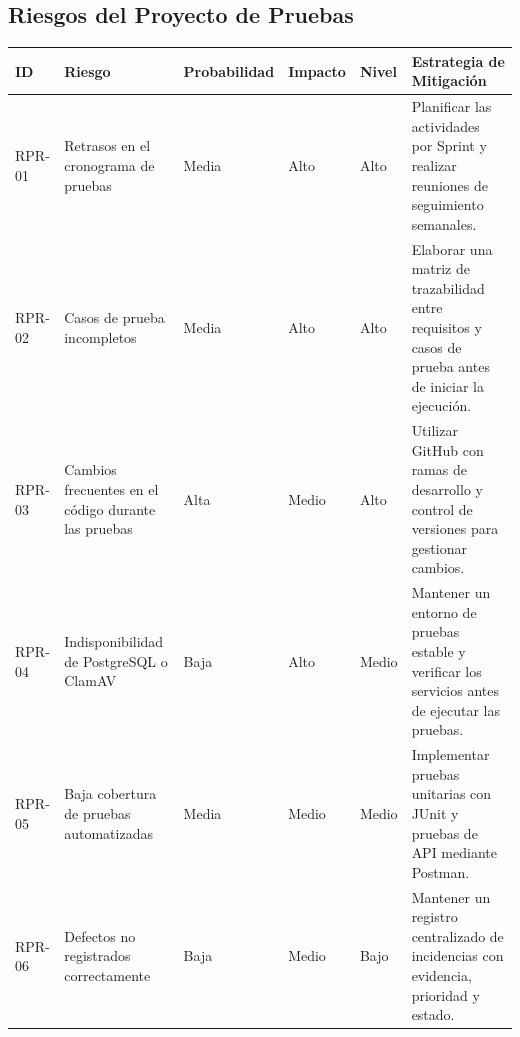 \subsection*{Riesgos del Proyecto de Pruebas}
\begin{longtable}{|p{1.5cm}|p{5cm}|p{2.5cm}|p{2.5cm}|p{2cm}|p{4cm}|}
\hline
\textbf{ID} & \textbf{Riesgo} & \textbf{Probabilidad} & \textbf{Impacto} & \textbf{Nivel} & \textbf{Estrategia de Mitigación} \\
\hline
RPR-01 & Retrasos en el cronograma de pruebas & Media & Alto & Alto & Planificar las actividades por Sprint y realizar reuniones de seguimiento semanales. \\
\hline
RPR-02 & Casos de prueba incompletos & Media & Alto & Alto & Elaborar una matriz de trazabilidad entre requisitos y casos de prueba antes de iniciar la ejecución. \\
\hline
RPR-03 & Cambios frecuentes en el código durante las pruebas & Alta & Medio & Alto & Utilizar GitHub con ramas de desarrollo y control de versiones para gestionar cambios. \\
\hline
RPR-04 & Indisponibilidad de PostgreSQL o ClamAV & Baja & Alto & Medio & Mantener un entorno de pruebas estable y verificar los servicios antes de ejecutar las pruebas. \\
\hline
RPR-05 & Baja cobertura de pruebas automatizadas & Media & Medio & Medio & Implementar pruebas unitarias con JUnit y pruebas de API mediante Postman. \\
\hline
RPR-06 & Defectos no registrados correctamente & Baja & Medio & Bajo & Mantener un registro centralizado de incidencias con evidencia, prioridad y estado. \\
\hline
\end{longtable}

